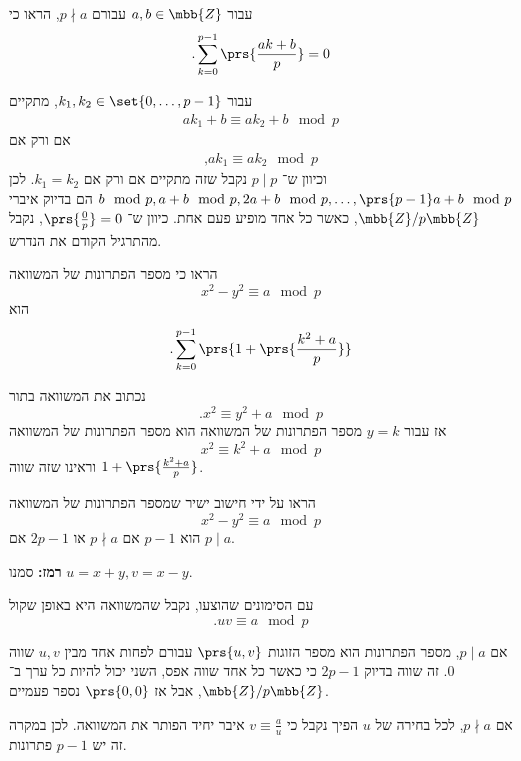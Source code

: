 \documentclass[a4paper,10pt,twoside,openany]{book}
\begin{document}
\begin{exercisechap}
עבור
$a,b \in \mbb{Z}$
עבורם
$p \nmid a$,
הראו כי
\[\text{.} \sum_{k=0}^{p-1} \prs{\frac{ak + b}{p}} = 0\]
\end{exercisechap}

\begin{solution}
עבור
$k_1, k_2 \in \set{0, \ldots, p-1}$,
מתקיים
\begin{align*}
ak_1 + b \equiv ak_2 + b \mod{p}
\end{align*}
אם ורק אם
\begin{align*}
\text{,} ak_1 \equiv ak_2 \mod{p}
\end{align*}
וכיוון ש־%
$p \mid p$
נקבל שזה מתקיים אם ורק אם
$k_1 = k_2$.
לכן
$b \mod{p}, a + b \mod{p}, 2a + b \mod{p}, \ldots, \prs{p-1}a + b \mod{p}$
הם בדיוק איברי
$\mbb{Z}/p\mbb{Z}$,
כאשר כל אחד מופיע פעם אחת.
כיוון ש־%
$\prs{\frac{0}{p}} = 0$,
נקבל מהתרגיל הקודם את הנדרש.
\end{solution}

\begin{exercisechap}
הראו כי מספר הפתרונות של המשוואה
\[x^2 - y^2 \equiv a \mod{p}\]
הוא
\[\text{.} \sum_{k=0}^{p-1} \prs{1 + \prs{\frac{k^2 + a}{p}}}\]
\end{exercisechap}

\begin{solution}
נכתוב את המשוואה בתור
\[\text{.} x^2 \equiv y^2 + a \mod{p}\]
אז עבור
$y = k$
מספר הפתרונות של המשוואה הוא מספר הפתרונות של המשוואה
\[x^2 \equiv k^2 + a \mod{p}\]
וראינו שזה שווה
$1 + \prs{\frac{k^2 + a}{p}}$.
\end{solution}

\begin{exercisechap}
הראו על ידי חישוב ישיר שמספר הפתרונות של המשוואה
\[x^2 - y^2 \equiv a \mod{p}\]
הוא
$p-1$
אם
$p \nmid a$
או
$2p-1$
אם
$p \mid a$.

\textbf{רמז:}
סמנו
$u = x+y, v = x-y$.
\end{exercisechap}

\begin{solution}
עם הסימונים שהוצעו, נקבל שהמשוואה היא באופן שקול
\[\text{.} uv \equiv a \mod{p}\]

אם
$p \mid a$,
מספר הפתרונות הוא מספר הזוגות
$\prs{u,v}$
עבורם לפחות אחד מבין
$u,v$
שווה
$0$.
זה שווה בדיוק
$2p - 1$
כי כאשר כל אחד שווה אפס, השני יכול להיות כל ערך ב־%
$\mbb{Z} / p \mbb{Z}$,
אבל אז
$\prs{0,0}$
נספר פעמיים.

אם
$p \nmid a$,
לכל בחירה של
$u$
הפיך נקבל כי
$v \equiv \frac{a}{u}$
איבר יחיד הפותר את המשוואה. לכן במקרה זה יש
$p-1$
פתרונות.
\end{solution}
\end{document}
